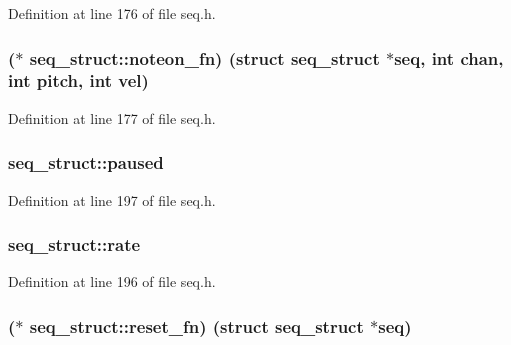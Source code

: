 Definition at line 176 of file seq.\+h.

\subsubsection[{\texorpdfstring{noteon\+\_\+fn}{noteon_fn}}]{($\ast$ seq\+\_\+struct\+::noteon\+\_\+fn) (struct {\bf seq\+\_\+struct} $\ast$seq, {\bf int} chan, {\bf int} {\bf pitch}, {\bf int} vel)}\hypertarget{structseq__struct_ac0db16fd627a17e659bbb86071eb0e75}{}\label{structseq__struct_ac0db16fd627a17e659bbb86071eb0e75}


Definition at line 177 of file seq.\+h.

\subsubsection[{\texorpdfstring{paused}{paused}}]{ seq\+\_\+struct\+::paused}\hypertarget{structseq__struct_a4500c32e24f096ce49378a836f15e027}{}\label{structseq__struct_a4500c32e24f096ce49378a836f15e027}


Definition at line 197 of file seq.\+h.

\subsubsection[{\texorpdfstring{rate}{rate}}]{ seq\+\_\+struct\+::rate}\hypertarget{structseq__struct_a236823cebe659a5326970e54bbe7d66b}{}\label{structseq__struct_a236823cebe659a5326970e54bbe7d66b}


Definition at line 196 of file seq.\+h.

\subsubsection[{\texorpdfstring{reset\+\_\+fn}{reset_fn}}]{($\ast$ seq\+\_\+struct\+::reset\+\_\+fn) (struct {\bf seq\+\_\+struct} $\ast$seq)}\hypertarget{structseq__struct_aebcd2f73801979e6e53e68b81fe30c49}{}\label{structseq__struct_aebcd2f73801979e6e53e68b81fe30c49}


